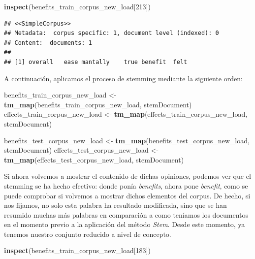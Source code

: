 \documentclass[spanish,]{article}
\newenvironment{Shaded}{\begin{snugshade}}{\end{snugshade}}
\newcommand{\KeywordTok}[1]{\textcolor[rgb]{0.13,0.29,0.53}{\textbf{#1}}}
\newcommand{\DecValTok}[1]{\textcolor[rgb]{0.00,0.00,0.81}{#1}}
\newcommand{\StringTok}[1]{\textcolor[rgb]{0.31,0.60,0.02}{#1}}
\newcommand{\NormalTok}[1]{#1}
\begin{document}
\begin{Shaded}
\begin{Highlighting}[]
\KeywordTok{inspect}\NormalTok{(benefits_train_corpus_new_load[}\DecValTok{213}\NormalTok{])}
\end{Highlighting}
\end{Shaded}

\begin{verbatim}
## <<SimpleCorpus>>
## Metadata:  corpus specific: 1, document level (indexed): 0
## Content:  documents: 1
## 
## [1] overall   ease mantally    true benefit  felt
\end{verbatim}

A continuación, aplicamos el proceso de stemming mediante la siguiente
orden:

\begin{Shaded}
\begin{Highlighting}[]
\NormalTok{benefits_train_corpus_new_load <-}\StringTok{ }\KeywordTok{tm_map}\NormalTok{(benefits_train_corpus_new_load, stemDocument)}
\NormalTok{effects_train_corpus_new_load <-}\StringTok{ }\KeywordTok{tm_map}\NormalTok{(effects_train_corpus_new_load, stemDocument)}

\NormalTok{benefits_test_corpus_new_load <-}\StringTok{ }\KeywordTok{tm_map}\NormalTok{(benefits_test_corpus_new_load, stemDocument)}
\NormalTok{effects_test_corpus_new_load <-}\StringTok{ }\KeywordTok{tm_map}\NormalTok{(effects_test_corpus_new_load, stemDocument)}
\end{Highlighting}
\end{Shaded}

Si ahora volvemos a mostrar el contenido de dichas opiniones, podemos
ver que el stemming se ha hecho efectivo: donde ponía \textit{benefits},
ahora pone \textit{benefit}, como se puede comprobar si volvemos a
mostrar dichos elementos del corpus. De hecho, si nos fijamos, no solo
esta palabra ha resultado modificada, sino que se han resumido muchas
más palabras en comparación a como teníamos los documentos en el momento
previo a la aplicación del método \textit{Stem}. Desde este momento, ya
tenemos nuestro conjunto reducido a nivel de concepto.

\begin{Shaded}
\begin{Highlighting}[]
\KeywordTok{inspect}\NormalTok{(benefits_train_corpus_new_load[}\DecValTok{183}\NormalTok{])}
\end{Highlighting}
\end{Shaded}
\end{document}
